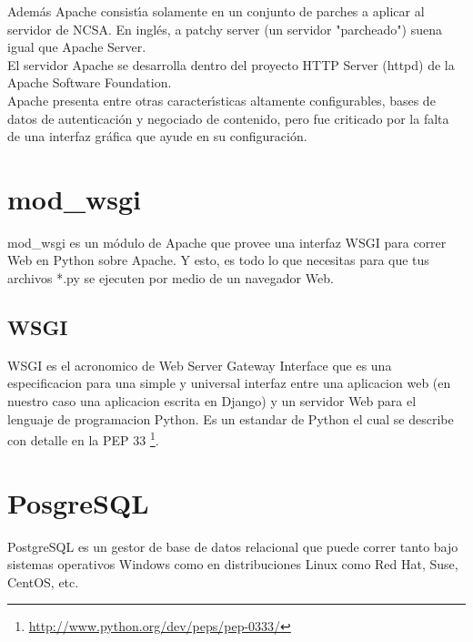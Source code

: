 Adem\'as Apache consist\'{\i}a solamente en un conjunto de parches a aplicar al servidor
de NCSA. En ingl\'es, a patchy server (un servidor "parcheado") suena igual que 
Apache Server. \\[0.1cm]

El servidor Apache se desarrolla dentro del proyecto HTTP Server (httpd) de la
Apache Software Foundation.\\[0.1cm]


Apache presenta entre otras caracter\'{\i}sticas altamente configurables, bases de
datos de autenticaci\'on y negociado de contenido, pero fue criticado por la falta
de una interfaz gr\'afica que ayude en su configuraci\'on.\\[0.2cm]

\section{mod\_wsgi}

mod\_wsgi es un m\'odulo de Apache que provee una interfaz WSGI para correr
 Web en Python sobre Apache. Y esto, es todo lo que necesitas para que tus
 archivos *.py se ejecuten por medio de un navegador Web.\\[0.1cm]
 

\subsection{WSGI}

WSGI es el acronomico de Web Server Gateway Interface que es una especificacion
para una simple y universal interfaz entre una aplicacion web (en nuestro caso
una aplicacion escrita en Django) y un servidor Web para el lenguaje de programacion
Python. Es un estandar de Python el cual se describe con detalle en la PEP 33
\footnote{\url{http://www.python.org/dev/peps/pep-0333/}}.\\[0.1cm]



\section{PosgreSQL}

PostgreSQL es un gestor de base de datos relacional que puede correr tanto bajo
sistemas operativos Windows como en distribuciones Linux como Red Hat, Suse,
CentOS, etc.\\[0.1cm]


